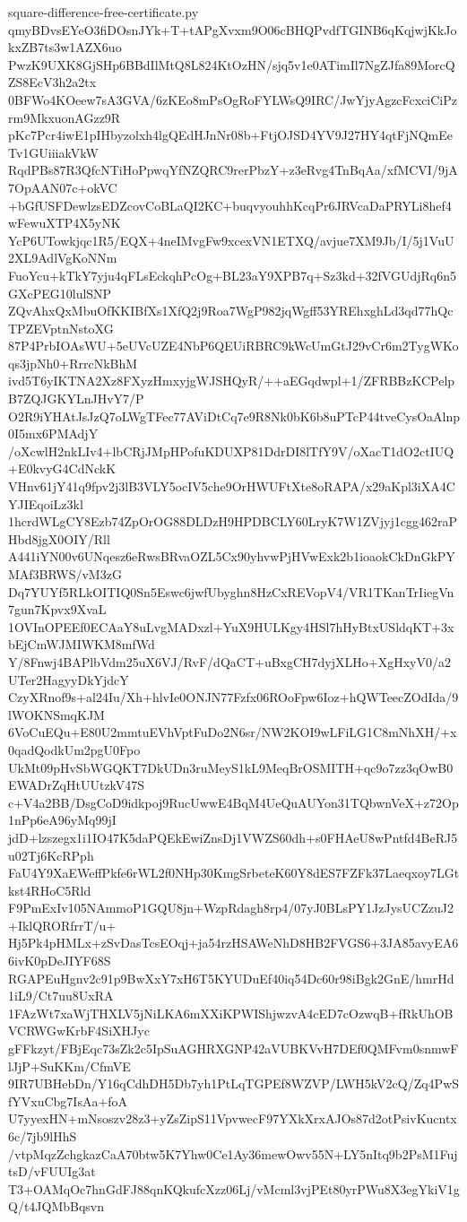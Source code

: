 \documentclass[11pt]{article}
\theoremstyle{definition}
\theoremstyle{remark}
\begin{document}
\begin{filecontents*}[overwrite]{square-difference-free-certificate.py}
qmyBDvsEYeO3fiDOsnJYk+T+tAPgXvxm9O06cBHQPvdfTGINB6qKqjwjKkJokxZB7ts3w1AZX6uo
PwzK9UXK8GjSHp6BBdIlMtQ8L824KtOzHN/sjq5v1e0ATimIl7NgZJfa89MorcQZS8EcV3h2a2tx
0BFWo4KOeew7sA3GVA/6zKEo8mPsOgRoFYLWsQ9IRC/JwYjyAgzcFcxciCiPzrm9MkxuonAGzz9R
pKc7Pcr4iwE1pIHbyzolxh4lgQEdHJnNr08b+FtjOJSD4YV9J27HY4qtFjNQmEeTv1GUiiiakVkW
RqdPBs87R3QfcNTiHoPpwqYfNZQRC9rerPbzY+z3eRvg4TnBqAa/xfMCVI/9jA7OpAAN07c+okVC
+bGfUSFDewlzsEDZcovCoBLaQI2KC+buqvyouhhKcqPr6JRVcaDaPRYLi8hef4wFewuXTP4X5yNK
YcP6UTowkjqc1R5/EQX+4neIMvgFw9xcexVN1ETXQ/avjue7XM9Jb/I/5j1VuU2XL9AdlVgKoNNm
FuoYcu+kTkY7yju4qFLsEckqhPcOg+BL23aY9XPB7q+Sz3kd+32fVGUdjRq6n5GXcPEG10lulSNP
ZQvAhxQxMbuOfKKIBfXs1XfQ2j9Roa7WgP982jqWgff53YREhxghLd3qd77hQcTPZEVptnNstoXG
87P4PrbIOAsWU+5eUVcUZE4NbP6QEUiRBRC9kWcUmGtJ29vCr6m2TygWKoqs3jpNh0+RrrcNkBhM
ivd5T6yIKTNA2Xz8FXyzHmxyjgWJSHQyR/++aEGqdwpl+1/ZFRBBzKCPelpB7ZQJGKYLnJHvY7/P
O2R9iYHAtJsJzQ7oLWgTFec77AViDtCq7e9R8Nk0bK6b8uPTcP44tveCysOaAlnp0I5mx6PMAdjY
/oXcwlH2nkLIv4+lbCRjJMpHPofuKDUXP81DdrDI8lTfY9V/oXacT1dO2ctIUQ+E0kvyG4CdNckK
VHnv61jY41q9fpv2j3lB3VLY5ocIV5che9OrHWUFtXte8oRAPA/x29aKpl3iXA4CYJIEqoiLz3kl
1hcrdWLgCY8Ezb74ZpOrOG88DLDzH9HPDBCLY60LryK7W1ZVjyj1cgg462raPHbd8jgX0OIY/Rll
A441iYN00v6UNqesz6eRwsBRvaOZL5Cx90yhvwPjHVwExk2b1ioaokCkDnGkPYMAf3BRWS/vM3zG
Dq7YUYf5RLkOITIQ0Sn5Eswc6jwfUbyghn8HzCxREVopV4/VR1TKanTrIiegVn7gun7Kpvx9XvaL
1OVInOPEEf0ECAaY8uLvgMADxzl+YuX9HULKgy4HSl7hHyBtxUSldqKT+3xbEjCmWJMIWKM8mfWd
Y/8Fnwj4BAPlbVdm25uX6VJ/RvF/dQaCT+uBxgCH7dyjXLHo+XgHxyV0/a2UTer2HagyyDkYjdcY
CzyXRnof9s+al24Iu/Xh+hlvIe0ONJN77Fzfx06ROoFpw6Ioz+hQWTeecZOdIda/9lWOKNSmqKJM
6VoCuEQu+E80U2mmtuEVhVptFuDo2N6sr/NW2KOI9wLFiLG1C8mNhXH/+x0qadQodkUm2pgU0Fpo
UkMt09pHvSbWGQKT7DkUDn3ruMeyS1kL9MeqBrOSMITH+qc9o7zz3qOwB0EWADrZqHtUUtzkV47S
c+V4a2BB/DsgCoD9idkpoj9RucUwwE4BqM4UeQuAUYon31TQbwnVeX+z72Op1nPp6eA96yMq99jI
jdD+lzszegx1i1IO47K5daPQEkEwiZnsDj1VWZS60dh+s0FHAeU8wPntfd4BeRJ5u02Tj6KcRPph
FaU4Y9XaEWeffPkfe6rWL2f0NHp30KmgSrbeteK60Y8dES7FZFk37Laeqxoy7LGtkst4RHoC5Rld
F9PmExIv105NAmmoP1GQU8jn+WzpRdagh8rp4/07yJ0BLsPY1JzJysUCZzuJ2+IklQRORfrrT/u+
Hj5Pk4pHMLx+zSvDasTcsEOqj+ja54rzHSAWeNhD8HB2FVGS6+3JA85avyEA66ivK0pDeJIYF68S
RGAPEuHgnv2c91p9BwXxY7xH6T5KYUDuEf40iq54Dc60r98iBgk2GnE/hmrHd1iL9/Ct7uu8UxRA
1FAzWt7xaWjTHXLV5jNiLKA6mXXiKPWIShjwzvA4cED7cOzwqB+fRkUhOBVCRWGwKrbF4SiXHJyc
gFFkzyt/FBjEqc73sZk2c5IpSuAGHRXGNP42aVUBKVvH7DEf0QMFvm0snmwFlJjP+SuKKm/CfmVE
9IR7UBHebDn/Y16qCdhDH5Db7yh1PtLqTGPEf8WZVP/LWH5kV2cQ/Zq4PwSfYVxuCbg7IsAa+foA
U7yyexHN+mNsoszv28z3+yZsZipS11VpvwecF97YXkXrxAJOs87d2otPsivKucntx6c/7jb9lHhS
/vtpMqzZchgkazCaA70btw5K7Yhw0Ce1Ay36mewOwv55N+LY5nItq9b2PsM1FujtsD/vFUUIg3at
T3+OAMqOc7hnGdFJ88qnKQkufcXzz06Lj/vMcml3vjPEt80yrPWu8X3egYkiV1gQ/t4JQMbBqsvn

\end{filecontents*}
\end{document}

